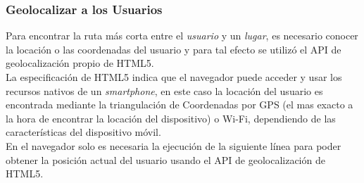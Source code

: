 

%
%
%



\subsubsection{Geolocalizar a los Usuarios}
\label{sub:Manejo de Usuarios}

Para encontrar la ruta más corta entre el \emph{usuario} y un \emph{lugar}, es necesario conocer la locación o las coordenadas del usuario y para tal efecto se utilizó el  API de geolocalización propio de HTML5. \\

La especificación de HTML5 indica que el navegador puede acceder y usar los recursos nativos de un \emph{smartphone}, en este caso la locación del usuario es encontrada mediante la triangulación de Coordenadas por GPS (el mas exacto a la hora de encontrar la locación del dispositivo) o Wi-Fi, dependiendo de las características del dispositivo móvil. \\

En el navegador solo es necesaria la ejecución de la siguiente línea para poder obtener la posición actual del usuario usando el API de geolocalización de HTML5.

